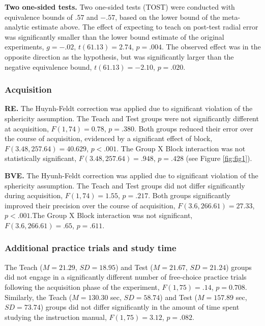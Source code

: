 \documentclass[
  english,
  man,floatsintext]{apa7}
\begin{document}
\textbf{Two one-sided tests.} Two one-sided tests (TOST) were conducted with equivalence bounds of \(.57\) and \(-.57\), based on the lower bound of the meta-analytic estimate above. The effect of expecting to teach on post-test radial error was significantly smaller than the lower bound estimate of the original experiments, \(g = -.02\), \(t(61.13) = 2.74\), \(p = .004\). The observed effect was in the opposite direction as the hypothesis, but was significantly larger than the negative equivalence bound, \(t(61.13) = -2.10\), \(p = .020\).

\hypertarget{acquisition}{%
\subsubsection{Acquisition}\label{acquisition}}

\textbf{RE.} The Huynh-Feldt correction was applied due to significant violation of the sphericity assumption. The Teach and Test groups were not significantly different at acquisition, \(F(1,74) = 0.78\), \(p = .380\). Both groups reduced their error over the course of acquisition, evidenced by a significant effect of block, \(F(3.48, 257.64) = 40.629\), \(p < .001\). The Group X Block interaction was not statistically significant, \(F(3.48, 257.64) = .948\), \(p =.428\) (see Figure \ref{fig:fig1}).

\textbf{BVE.} The Hyunh-Feldt correction was applied due to significant violation of the sphericity assumption. The Teach and Test groups did not differ significantly during acquisition, \(F(1,74) = 1.55\), \(p = .217\). Both groups significantly improved their precision over the course of acquisition, \(F(3.6, 266.61) = 27.33\), \(p < .001\).The Group X Block interaction was not significant, \(F(3.6, 266.61) = .65\), \(p = .611\).

\hypertarget{additional-practice-trials-and-study-time}{%
\subsubsection{Additional practice trials and study time}\label{additional-practice-trials-and-study-time}}

The Teach (\(M = 21.29\), \(SD = 18.95\)) and Test (\(M = 21.67\), \(SD = 21.24\)) groups did not engage in a significantly different number of free-choice practice trials following the acquisition phase of the experiment, \(F(1,75) = .14\), \(p = 0.708\). Similarly, the Teach (\(M = 130.30\) sec, \(SD = 58.74\)) and Test (\(M = 157.89\) sec, \(SD = 73.74\)) groups did not differ significantly in the amount of time spent studying the instruction manual, \(F(1, 75) = 3.12\), \(p = .082\).
\end{document}
